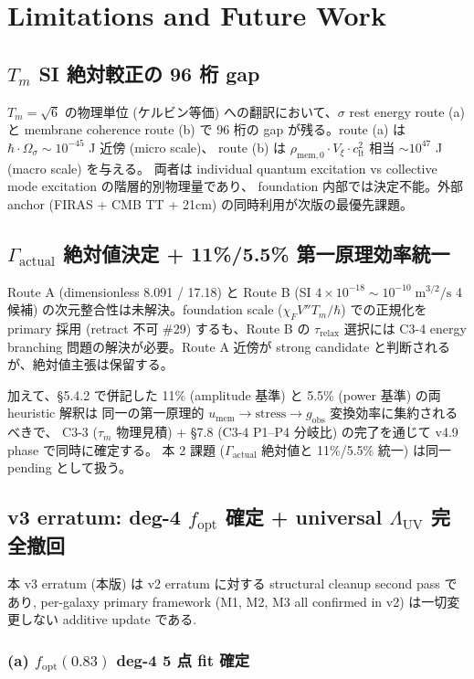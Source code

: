 \documentclass[11pt,a4paper]{ltjsarticle}
\newcommand{\Vxi}{V_{\xi}}
\newcommand{\Tm}{T_{m}}
\newcommand{\taum}{\tau_{m}}
\newcommand{\taur}{\tau_{\mathrm{relax}}}
\newcommand{\umem}{u_{\mathrm{mem}}}
\newcommand{\rhomem}{\rho_{\mathrm{mem},0}}
\newcommand{\Lambdauv}{\Lambda_{\mathrm{UV}}}
\newcommand{\Gammaact}{\Gamma_{\mathrm{actual}}}
\newcommand{\gobs}{g_{\mathrm{obs}}}
\newcommand{\clt}{c_{\mathrm{lt}}}       %
\newcommand{\fopt}{f_{\mathrm{opt}}}
\begin{document}
\section{Limitations and Future Work}

\subsection{$\Tm$ SI 絶対較正の 96 桁 gap}
$\Tm = \sqrt{6}$ の物理単位 (ケルビン等価) への翻訳において、$\sigma$ rest energy route (a) と
membrane coherence route (b) で 96 桁の gap が残る。route (a) は
$\hbar \cdot \Omega_\sigma \sim 10^{-45}$ J 近傍 (micro scale)、
route (b) は $\rhomem \cdot \Vxi \cdot \clt^2$ 相当 $\sim 10^{47}$ J (macro scale) を与える。
両者は individual quantum excitation vs collective mode excitation の階層的別物理量であり、
foundation 内部では決定不能。外部 anchor (FIRAS + CMB TT + 21cm) の同時利用が次版の最優先課題。

\subsection{$\Gammaact$ 絶対値決定 + 11\%/5.5\% 第一原理効率統一}
Route A (dimensionless 8.091 / 17.18) と Route B (SI $4 \times 10^{-18}\sim 10^{-10}\;\mathrm{m}^{3/2}/\mathrm{s}$
4 候補) の次元整合性は未解決。foundation scale ($\chi_F V'' \Tm / \hbar$) での正規化を
primary 採用 (retract 不可 \#29) するも、Route B の $\taur$ 選択には C3-4 energy branching
問題の解決が必要。Route A 近傍が strong candidate と判断されるが、絶対値主張は保留する。

加えて、\S 5.4.2 で併記した 11\% (amplitude 基準) と 5.5\% (power 基準) の両 heuristic 解釈は
同一の第一原理的 $\umem \to \text{stress} \to \gobs$ 変換効率に集約されるべきで、
C3-3 ($\taum$ 物理見積) + \S 7.8 (C3-4 P1--P4 分岐比) の完了を通じて v4.9 phase で同時に確定する。
本 2 課題 ($\Gammaact$ 絶対値と 11\%/5.5\% 統一) は同一 pending として扱う。

\subsection{v3 erratum: deg-4 $\fopt$ 確定 + universal $\Lambdauv$ 完全撤回}
本 v3 erratum (本版) は v2 erratum に対する structural cleanup second pass であり, per-galaxy primary
framework (M1, M2, M3 all confirmed in v2) は一切変更しない additive update である.

\subsubsection*{(a) $\fopt(0.83)$ deg-4 5 点 fit 確定}
\end{document}
